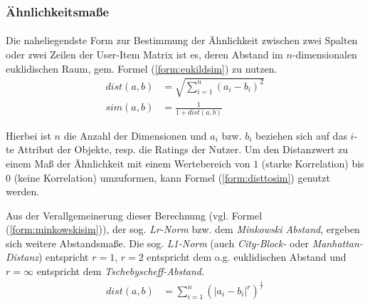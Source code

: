 \subsubsection{Ähnlichkeitsmaße}
\label{sec:similarities}

\paragraph{} Die naheliegendste Form zur Bestimmung der Ähnlichkeit zwischen zwei Spalten oder zwei Zeilen der User-Item Matrix ist es, deren Abstand im $n$-dimensionalen euklidischen Raum, gem. Formel (\ref{form:eukildsim}) zu nutzen.
\begin{align}
\label{form:eukildsim}
dist(a,b) & = \sqrt{\sum_{i=1}^{n} (a_i - b_i)^2} \\
sim(a,b) & = \frac{1}{1+dist(a,b)} \label{form:disttosim}
\end{align}

Hierbei ist $n$ die Anzahl der Dimensionen und $a_i$ bzw. $b_i$ beziehen sich auf das  $i$-te Attribut der Objekte, resp. die Ratings der Nutzer. Um den Distanzwert zu einem Maß der Ähnlichkeit mit einem Wertebereich von $1$ (starke Korrelation) bis $0$ (keine Korrelation) umzuformen, kann Formel (\ref{form:disttosim}) genutzt werden.

Aus der Verallgemeinerung dieser Berechnung (vgl. Formel (\ref{form:minkowskisim})), der sog. \textit{Lr-Norm} bzw. dem \textit{Minkowski Abstand}, ergeben sich weitere Abstandsmaße. Die sog. \textit{L1-Norm} (auch \textit{City-Block-} oder \textit{Manhattan-Distanz}) entspricht $r=1$, $r=2$ entspricht dem o.g. euklidischen Abstand und $ r=\infty $ entspricht dem \textit{Tschebyscheff-Abstand}. \citep{hb_02}
\begin{align}
\label{form:minkowskisim}
dist(a,b) & = \sum_{i=1}^{n} (\left| a_i - b_i \right|^r)^\frac{1}{r}
\end{align}

